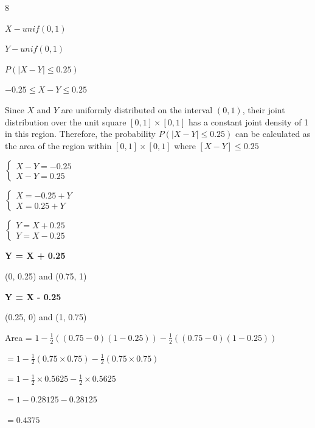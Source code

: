 \documentclass[12 pt]{article}
\begin{document}
    \begin{exercise}{8}
    \hfill
    
    $X - unif(0,1)$

    $Y - unif(0,1)$

    \hfill

    $P(|X-Y| \leq 0.25)$

    $-0.25 \leq X-Y \leq 0.25$

    Since $X$ and $Y$ are uniformly distributed on the interval $(0,1)$, their joint distribution over the unit square $[0,1] \times [0,1]$ has a constant joint density of 1 in this region. Therefore, the probability $P(|X-Y| \leq 0.25)$ can be calculated as the area of the region within $[0,1] \times [0,1]$ where $[X-Y] \leq 0.25$

    $\begin{cases}
        X-Y = -0.25 \\
        X-Y = 0.25
    \end{cases}$

    $\begin{cases}
        X = -0.25 + Y \\
        X = 0.25 + Y
    \end{cases}$

    $\begin{cases}
        Y = X + 0.25 \\
        Y = X - 0.25
    \end{cases}$

    \hfill

    \textbf{Y = X + 0.25}
    
    (0, 0.25) and (0.75, 1)

    \textbf{Y = X - 0.25}

    (0.25, 0) and (1, 0.75)

    \hfill

    Area = $1 - \frac{1}{2}((0.75-0)(1-0.25)) - \frac{1}{2}((0.75-0)(1-0.25))$

    $= 1 - \frac{1}{2}(0.75 \times 0.75) - \frac{1}{2}(0.75 \times 0.75)$

    $= 1 - \frac{1}{2} \times 0.5625 - \frac{1}{2} \times 0.5625$

    $= 1 - 0.28125 - 0.28125$

    $= 0.4375$

    
    \hfill
    \end{exercise}
\end{document}

